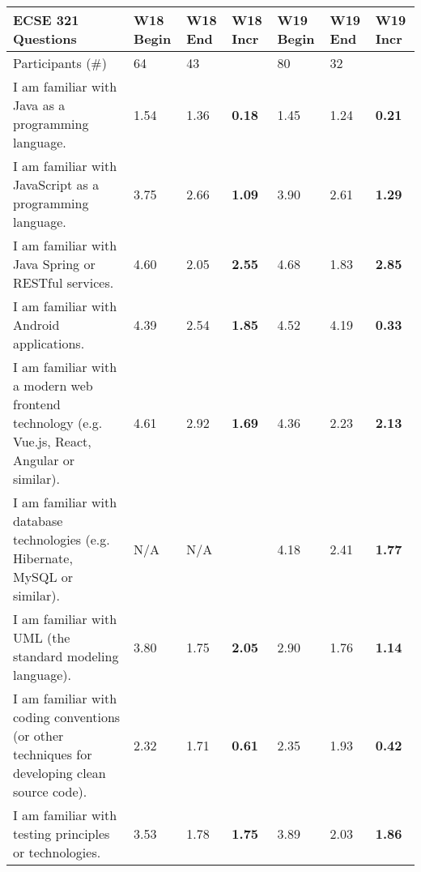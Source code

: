 \begin{table}[htb]
\footnotesize
\begin{tabular}{@{}p{8cm}p{1cm}p{1cm}p{1cm}p{1cm}p{1cm}p{1cm}@{}}
\toprule
\textbf{ECSE 321 Questions} & 
\textbf{W18} \newline \textbf{Begin} & 
\textbf{W18} \newline \textbf{End} & 
\textbf{W18} \newline \textbf{Incr} & 
\textbf{W19} \newline \textbf{Begin} & 
\textbf{W19} \newline \textbf{End} &
\textbf{W19} \newline \textbf{Incr} \\ \toprule
Participants (\#) & 64 & 43 &  & 80 & 32 &  \\ \midrule
I am familiar with Java as a programming language. & 1.54 & 1.36 & \textbf{0.18} & 1.45 & 1.24 & \textbf{0.21} \\ \midrule

I am familiar with JavaScript as a programming language. & 3.75 & 2.66 & \textbf{1.09} & 3.90 & 2.61 & \textbf{1.29} \\ \midrule

I am familiar with Java Spring or RESTful services. & 4.60 & 2.05 & \textbf{2.55} & 4.68 & 1.83 & \textbf{2.85}  \\ \midrule

I am familiar with Android applications. & 4.39 & 2.54 & \textbf{1.85} & 4.52 & 4.19 & \textbf{0.33}   \\ \midrule

I am familiar with a modern web frontend technology (e.g. Vue.js, React, Angular or similar). & 4.61 & 2.92 & \textbf{1.69} & 4.36 & 2.23 & \textbf{2.13}  \\ \midrule

I am familiar with database technologies (e.g. Hibernate, MySQL or similar). & N/A & N/A & & 
4.18 & 2.41 & \textbf{1.77}  \\ \midrule

I am familiar with UML (the standard modeling language). & 3.80 & 1.75 & \textbf{2.05} & 
2.90 & 1.76 & \textbf{1.14}  \\ \midrule

I am familiar with coding conventions (or other techniques for developing clean source code). & 2.32 & 1.71 & \textbf{0.61} & 2.35 & 1.93 & \textbf{0.42}   \\ \midrule

I am familiar with testing principles or technologies.
& 3.53 & 1.78 & \textbf{1.75} & 3.89 & 2.03 & \textbf{1.86}  \\ \midrule


\end{tabular}
\end{table}
